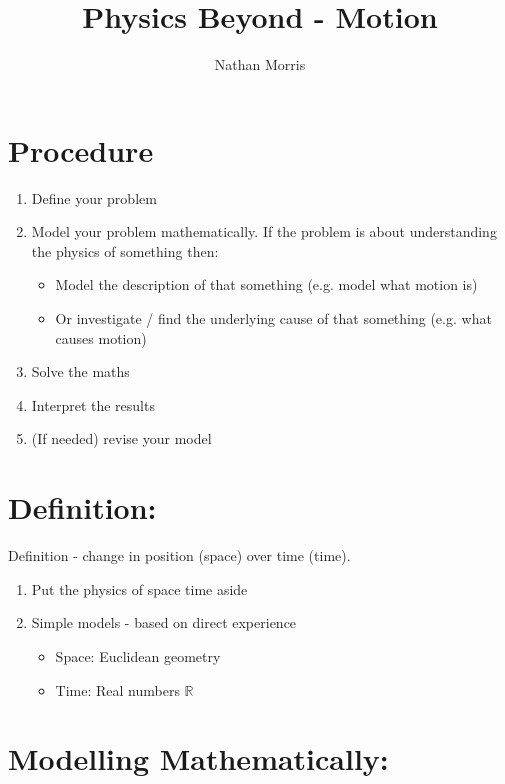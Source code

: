 \documentclass[a4paper, 12pt]{article}
\begin{document}
\title{Physics Beyond - Motion}
\author{Nathan Morris}
\maketitle

\newpage

\tableofcontents
{}

\newpage

\section{Procedure}
\begin{enumerate}
\item Define your problem
\item Model your problem mathematically. If the problem is about understanding the physics of something then:
\begin{itemize}
\item Model the description of that something (e.g. model what motion is)
\item Or investigate / find the underlying cause of that something (e.g. what causes motion)
\end{itemize}
\item Solve the maths
\item Interpret the results
\item (If needed) revise your model
\end{enumerate}

\newpage

\section{Definition:}
Definition - change in position (space) over time (time).
\begin{enumerate}
\item Put the physics of space time aside
\item Simple models - based on direct experience
\begin{itemize}
\item Space: Euclidean geometry
\item Time: Real numbers   
$\mathbb{R}$
\end{itemize}
\end{enumerate}

\section{Modelling Mathematically:}
\end{document}
